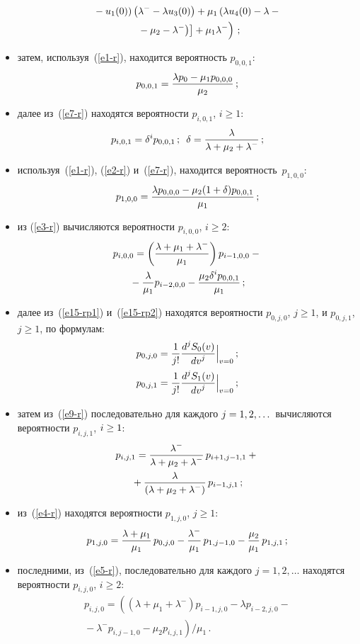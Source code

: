 \begin{multicols}{2}
\begin{itemize}
\noindent
\begin{multline*}
\left.\left.\left.{}- u_1(0)\right) \left(\lambda^- - \lambda u_3(0)\right)
+
\mu_1 \left(\lambda u_4(0) - \lambda -{}\right.\right.\right.\\
\left.\left.\left.{}- \mu_2 -  \lambda^- \right)
\right] +
\mu_1 \lambda^- 
\vphantom{u_2^{'}}\right)\,;
\end{multline*}
\item затем, используя~(\ref{e1-r}), находится вероятность $p_{0,0,1}$:
$$ p_{0,0,1}
= \displaystyle\frac{\displaystyle \lambda p_0 - \mu_1 p_{0,0,0}
\mathstrut}{\displaystyle \mu_2 \mathstrut}\,;
$$
\item далее из~(\ref{e7-r}) находятся вероятности $p_{i,0,1}$, $i \ge 1$:
$$
p_{i,0,1}= \delta^i p_{0,0,1}\,; \enskip \delta=\displaystyle\frac{\displaystyle \lambda\mathstrut}{\displaystyle \lambda+\mu_2+\lambda^- \mathstrut}\,;
$$
\item используя~(\ref{e1-r}), (\ref{e2-r}) и~(\ref{e7-r}), находится
вероятность~$p_{1,0,0}$:
$$
p_{1,0,0}= \displaystyle\frac{\displaystyle \lambda p_{0,0,0} - \mu_2 (1+\delta) p_{0,0,1}\mathstrut}{\displaystyle \mu_1\mathstrut}\,;
$$
\item из (\ref{e3-r}) вычисляются вероятности $p_{i,0,0}$, $i \ge 2$:
\begin{multline*}
p_{i,0,0}= \left ( \displaystyle\frac{\displaystyle  \lambda + \mu_1 + \lambda^-\mathstrut}{\displaystyle \mu_1\mathstrut}
\right )
p_{i-1,0,0}
-{}\\
{}-\displaystyle\frac{\displaystyle \lambda\mathstrut}{\displaystyle \mu_1\mathstrut} p_{i-2,0,0} 
-
\displaystyle\frac{\displaystyle \mu_2 \delta^i p_{0,0,1}\mathstrut}{\displaystyle \mu_1\mathstrut}\,;
\end{multline*}
\item далее из~(\ref{e15-rp1}) и~(\ref{e15-rp2}) находятся
вероятности $p_{0,j,0}$,  $j \ge 1$, и $p_{0,j,1}$, $ j \ge 1$,
по формулам:
\begin{align*}
p_{0,j,0} &= \displaystyle\frac{\displaystyle 1\mathstrut}{\displaystyle j!\mathstrut} 
\displaystyle\frac{\displaystyle d^{j}S_0(v) \mathstrut}{\displaystyle d v^{j}\mathstrut}
\Big|_{v=0}
\,; \\
p_{0,j,1}&= \displaystyle\frac{\displaystyle 1\mathstrut}{\displaystyle j!\mathstrut}
\displaystyle\frac{\displaystyle  d^{j}S_1(v)\mathstrut}{\displaystyle d v^{j}\mathstrut}
\Big|_{v=0}\,;
\end{align*}
\item затем из~(\ref{e9-r}) последовательно
для каждого $j\hm=1, 2, \dots$ вычисляются вероятности $p_{i,j,1}$, $i \hm\ge 1$:
\begin{multline*}
p_{i,j,1}=\displaystyle\frac{\displaystyle \lambda^- \mathstrut}{\displaystyle \lambda+\mu_2+\lambda^-\mathstrut}\, p_{i+1,j-1,1} + {}\\
{}+
\displaystyle\frac{\displaystyle \lambda\mathstrut}{\displaystyle (\lambda+\mu_2+\lambda^-)\mathstrut} \,p_{i-1,j,1}\,;
\end{multline*}
\item из~(\ref{e4-r}) находятся вероятности $p_{1,j,0}$, $j \ge 1$:
$$
p_{1,j,0}= \displaystyle\frac{\displaystyle \lambda+\mu_1\mathstrut}{\displaystyle \mu_1\mathstrut}\, p_{0,j,0} - \displaystyle\frac{\displaystyle \lambda^-\mathstrut}{\displaystyle \mu_1\mathstrut}\, p_{1,j-1,0} - \displaystyle\frac{\displaystyle \mu_2\mathstrut}{\displaystyle \mu_1\mathstrut} \,p_{1,j,1}\,;
$$
\item последними, из~(\ref{e5-r}), последовательно
для каж\-до\-го $j=1, 2, \dots$ находятся вероятности $p_{i,j,0}$, $i \ge 2$:
\begin{multline*}
p_{i,j,0}= \left((\lambda+\mu_1+\lambda^-) p_{i-1,j,0} - \lambda p_{i-2,j,0} - {}\right.\\
\left.{}-
\lambda^- p_{i,j-1,0} - \mu_2 p_{i,j,1}\right)\big /\mu_1\,.
\end{multline*}
\end{itemize}


\end{multicols}
